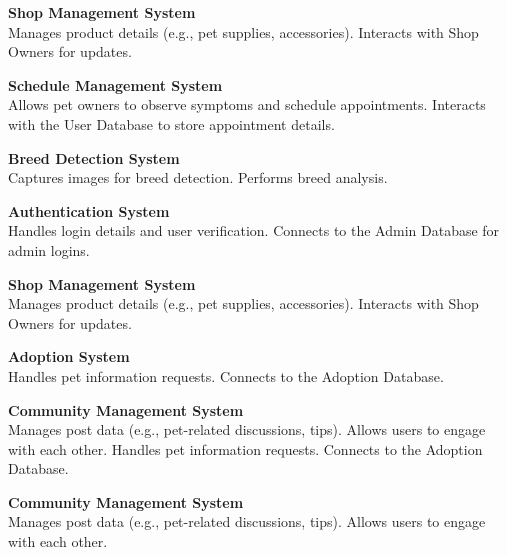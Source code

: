         \noindent\textbf{Shop Management System}\\
        Manages product details (e.g., pet supplies, accessories).
        Interacts with Shop Owners for updates.
    
        \noindent\textbf{Schedule Management System}\\
        Allows pet owners to observe symptoms and schedule appointments.
        Interacts with the User Database to store appointment details.
    
        \noindent\textbf{Breed Detection System}\\
        Captures images for breed detection.
        Performs breed analysis.
    
        \noindent\textbf{Authentication System}\\
        Handles login details and user verification.
        Connects to the Admin Database for admin logins.
    
        \noindent\textbf{Shop Management System}\\
        Manages product details (e.g., pet supplies, accessories).
        Interacts with Shop Owners for updates.
    
        \noindent\textbf{Adoption System}\\
        Handles pet information requests.
        Connects to the Adoption Database.
    
        \noindent\textbf{Community Management System}\\
        Manages post data (e.g., pet-related discussions, tips).
        Allows users to engage with each other.
        Handles pet information requests.
        Connects to the Adoption Database.
    
        \noindent\textbf{Community Management System}\\
        Manages post data (e.g., pet-related discussions, tips).
        Allows users to engage with each other.